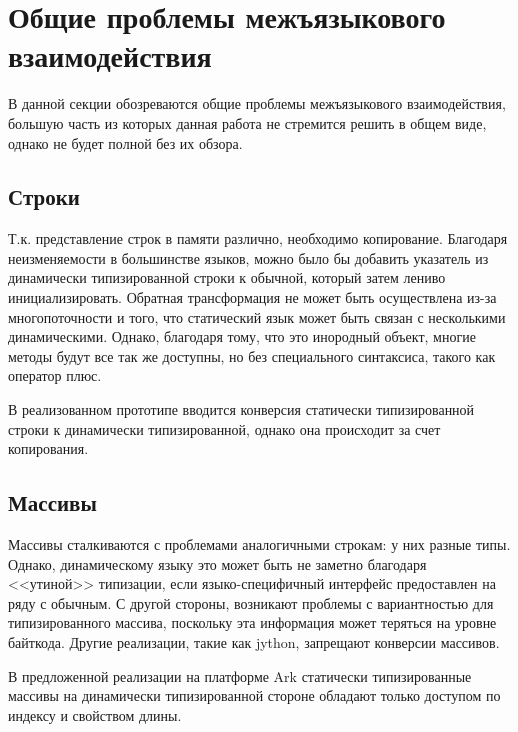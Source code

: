 \documentclass[times
,titlepage
]{itmo-student-thesis}
\begin{document}
\section{Общие проблемы межъязыкового взаимодействия}
В данной секции обозреваются общие проблемы межъязыкового взаимодействия, большую часть из которых данная работа не стремится решить в общем виде, однако не будет полной без их обзора.

\subsection{Строки}
Т.к. представление строк в памяти различно, необходимо копирование. Благодаря неизменяемости в большинстве языков, можно было бы добавить указатель из динамически типизированной строки к обычной, который затем лениво инициализировать. Обратная трансформация не может быть осуществлена из-за многопоточности и того, что статический язык может быть связан с несколькими динамическими. Однако, благодаря тому, что это инородный объект, многие методы будут все так же доступны, но без специального синтаксиса, такого как оператор плюс.

В реализованном прототипе вводится конверсия статически типизированной строки к динамически типизированной, однако она происходит за счет копирования.

\subsection{Массивы}
Массивы сталкиваются с проблемами аналогичными строкам: у них разные типы. Однако, динамическому языку это может быть не заметно благодаря <<утиной>> типизации, если языко-специфичный интерфейс предоставлен на ряду с обычным. С другой стороны, возникают проблемы с вариантностью для типизированного массива, поскольку эта информация может теряться на уровне байткода. Другие реализации, такие как jython, запрещают конверсии массивов.

В предложенной реализации на платформе Ark статически типизированные массивы на динамически типизированной стороне обладают только доступом по индексу и свойством длины.
\end{document}
